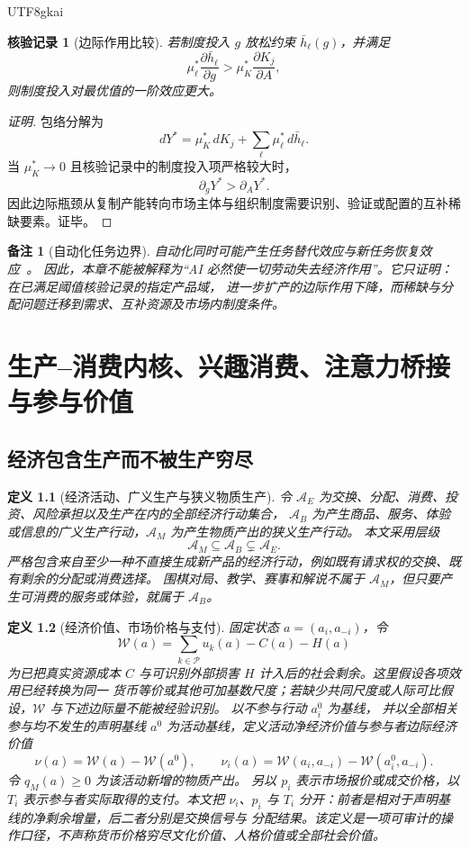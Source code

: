 \documentclass[12pt,a4paper,openany]{report}
\newtheorem{definition}{定义}[chapter]
\newtheorem{remark}{备注}[chapter]
\newtheorem{Certificate}{核验记录}[chapter]
\newcommand{\Part}{\mathcal P}
\newcommand{\Act}{\mathcal A}
\begin{document}
\begin{CJK*}{UTF8}{gkai}
\begin{Certificate}[边际作用比较]
若制度投入 \(g\) 放松约束 \(\bar h_\ell(g)\)，并满足
\[
  \mu_\ell^*\frac{\partial\bar h_\ell}{\partial g}
  >
  \mu_K^*\frac{\partial K_j}{\partial A},
\]
则制度投入对最优值的一阶效应更大。
\end{Certificate}

\begin{proof}[证明]
包络分解为
\[
  dY^*
  =
  \mu_K^*\,dK_j
  +\sum_\ell\mu_\ell^*\,d\bar h_\ell.
\]
当 \(\mu_K^*\to0\) 且核验记录中的制度投入项严格较大时，
\[
  \partial_gY^*>\partial_AY^*.
\]
因此边际瓶颈从复制产能转向市场主体与组织制度需要识别、验证或配置的互补稀缺要素。证毕。
\end{proof}

\begin{remark}[自动化任务边界]
自动化同时可能产生任务替代效应与新任务恢复效应~\cite{AcemogluRestrepo2019}。
因此，本章不能被解释为“AI 必然使一切劳动失去经济作用”。它只证明：在已满足阈值核验记录的指定产品域，
进一步扩产的边际作用下降，而稀缺与分配问题迁移到需求、互补资源及市场内制度条件。
\end{remark}
\clearpage
\chapter{生产--消费内核、兴趣消费、注意力桥接与参与价值}
\label{chap:market-go-homotopy}

\section{经济包含生产而不被生产穷尽}

\begin{definition}[经济活动、广义生产与狭义物质生产]
令 \(\Act_E\) 为交换、分配、消费、投资、风险承担以及生产在内的全部经济行动集合，
\(\Act_B\) 为产生商品、服务、体验或信息的广义生产行动，\(\Act_M\) 为产生物质产出的狭义生产行动。
本文采用层级
\[
  \Act_M\subseteq\Act_B\subsetneq\Act_E.
\]
严格包含来自至少一种不直接生成新产品的经济行动，例如既有请求权的交换、既有剩余的分配或消费选择。
围棋对局、教学、赛事和解说不属于 \(\Act_M\)，但只要产生可消费的服务或体验，就属于 \(\Act_B\)。
\end{definition}

\begin{definition}[经济价值、市场价格与支付]
固定状态 \(a=(a_i,a_{-i})\)，令
\[
\mathcal W(a)
  =\sum_{k\in\Part}u_k(a)-C(a)-H(a)
\]
为已把真实资源成本 \(C\) 与可识别外部损害 \(H\) 计入后的社会剩余。这里假设各项效用已经转换为同一
货币等价或其他可加基数尺度；若缺少共同尺度或人际可比假设，\(\mathcal W\) 与下述边际量不能被经验识别。
以不参与行动 \(a_i^0\) 为基线，
并以全部相关参与均不发生的声明基线 \(a^0\) 为活动基线，定义活动净经济价值与参与者边际经济价值
\[
  \nu(a)=\mathcal W(a)-\mathcal W(a^0),
  \qquad
  \nu_i(a)
  =\mathcal W(a_i,a_{-i})-\mathcal W(a_i^0,a_{-i}).
\]
令 \(q_M(a)\ge0\) 为该活动新增的物质产出。
另以 \(p_i\) 表示市场报价或成交价格，以 \(T_i\) 表示参与者实际取得的支付。本文把
\(\nu_i\)、\(p_i\) 与 \(T_i\) 分开：前者是相对于声明基线的净剩余增量，后二者分别是交换信号与
分配结果。该定义是一项可审计的操作口径，不声称货币价格穷尽文化价值、人格价值或全部社会价值。
\end{definition}


\end{CJK*}
\end{document}
